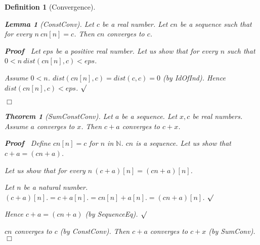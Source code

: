 \documentclass{article}
\newenvironment{forthel}{\begin{leftbar}}{\end{leftbar}}
\newenvironment{proof}{\noindent\textbf{Proof\ }}{\hspace*{\fill}$\Box$\medskip}
\newenvironment{subproof}{\begin{list}{}{}
		\item[\text{Proof}]}{\hfill $\surd$ \end{list}}
\newtheorem{lemma}{Lemma}
\newtheorem{theorem}{Theorem}
\newtheorem{definition}{Definition}
\newcommand{\NN}{\mathbb{N}}
\newcommand{\plusone}{+}
\newcommand{\plustwo}{+}
\begin{document}
\begin{forthel}
\begin{definition}[Convergence]
	\begin{lemma}[ConstConv]
	Let $c$ be a real number. Let $cn$ be a sequence such that for every $n \ cn[n] = c$.
	Then $cn$ converges to $c$.
	\end{lemma}
	\begin{proof}
	Let $eps$ be a positive real number.
	Let us show that for every $n$ such that $0 < n \ dist(cn[n],c) < eps$.
	\begin{subproof}
	Assume $0 < n$.
	$dist(cn[n],c) = dist(c,c) = 0$ (by IdOfInd).
	Hence $dist(cn[n],c) < eps$.
	\end{subproof}
	\end{proof}
	
	\begin{theorem}[SumConstConv]
	Let $a$ be a sequence. Let $x,c$ be real numbers. Assume $a$ converges to $x$.
	Then $c \plustwo a$ converges to $c + x$.
	\end{theorem}
	\begin{proof}
	Define $cn[n] = c$ for $n$ in $\NN$.
	$cn$ is a sequence.
	Let us show that $c \plustwo a = (cn \plusone a)$.
	\begin{subproof}
	Let us show that for every $n \ (c \plustwo a)[n] = (cn \plusone a)[n]$.
	\begin{subproof}
	Let $n$ be a natural number.
	$(c \plustwo a)[n] .= c + a[n]
	.= cn[n] + a[n]
	.= (cn \plusone a)[n]$.
	\end{subproof}
	Hence $c \plustwo a = (cn \plusone a)$ (by SequenceEq).
	\end{subproof}
	$cn$ converges to $c$ (by ConstConv).
	Then $c \plustwo a$ converges to $c + x$ (by SumConv).
	\end{proof}
	

\end{definition}
\end{forthel}
\end{document}
